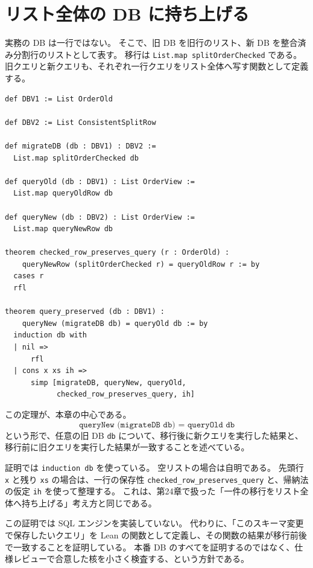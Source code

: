 \section{リスト全体の DB に持ち上げる}

実務の DB は一行ではない。
そこで、旧 DB を旧行のリスト、新 DB を整合済み分割行のリストとして表す。
移行は \texttt{List.map splitOrderChecked} である。
旧クエリと新クエリも、それぞれ一行クエリをリスト全体へ写す関数として定義する。

\begin{listing}[htbp]
\begin{verbatim}
def DBV1 := List OrderOld

def DBV2 := List ConsistentSplitRow

def migrateDB (db : DBV1) : DBV2 :=
  List.map splitOrderChecked db

def queryOld (db : DBV1) : List OrderView :=
  List.map queryOldRow db

def queryNew (db : DBV2) : List OrderView :=
  List.map queryNewRow db

theorem checked_row_preserves_query (r : OrderOld) :
    queryNewRow (splitOrderChecked r) = queryOldRow r := by
  cases r
  rfl

theorem query_preserved (db : DBV1) :
    queryNew (migrateDB db) = queryOld db := by
  induction db with
  | nil =>
      rfl
  | cons x xs ih =>
      simp [migrateDB, queryNew, queryOld,
            checked_row_preserves_query, ih]
\end{verbatim}
\caption{DB 全体の移行とクエリ保存}
\label{lst:ch26-list-preservation}
\end{listing}

この定理が、本章の中心である。
\[
  \texttt{queryNew (migrateDB db) = queryOld db}
\]
という形で、任意の旧 DB \texttt{db} について、移行後に新クエリを実行した結果と、移行前に旧クエリを実行した結果が一致することを述べている。

証明では \texttt{induction db} を使っている。
空リストの場合は自明である。
先頭行 \texttt{x} と残り \texttt{xs} の場合は、一行の保存性 \texttt{checked\_row\_preserves\_query} と、帰納法の仮定 \texttt{ih} を使って整理する。
これは、第24章で扱った「一件の移行をリスト全体へ持ち上げる」考え方と同じである。

\begin{leanbox}
この証明では SQL エンジンを実装していない。
代わりに、「このスキーマ変更で保存したいクエリ」を Lean の関数として定義し、その関数の結果が移行前後で一致することを証明している。
本番 DB のすべてを証明するのではなく、仕様レビューで合意した核を小さく検査する、という方針である。
\end{leanbox}

